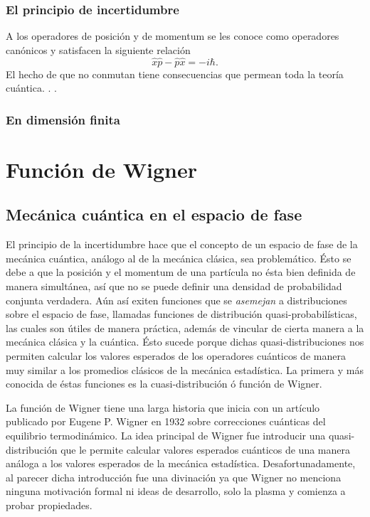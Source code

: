 \documentclass[a4paper]{report}
\begin{document}
  \subsection{El principio de incertidumbre}

  A los operadores de posición y de momentum se les conoce
  como operadores canónicos y satisfacen la siguiente
  relación
  \begin{equation}
    \hat{x} \hat{p} - \hat{p} \hat{x} 
    = -i\hbar.
  \end{equation}
  El hecho de que no conmutan tiene consecuencias que
  permean toda la teoría cuántica. . . 

  \subsection{En dimensión finita}


  \chapter{Función de Wigner}

  \section{Mecánica cuántica en el espacio de fase}

  El principio de la incertidumbre hace que el concepto de
  un espacio de fase de la mecánica cuántica, análogo al de
  la mecánica clásica, sea problemático. Ésto se debe a que
  la posición y el momentum de una partícula no ésta bien
  definida de manera simultánea, así que no se puede definir
  una densidad de probabilidad conjunta verdadera. Aún así
  exiten funciones que se \textit{asemejan} a distribuciones
  sobre el espacio de fase, llamadas funciones de
  distribución quasi-probabilísticas, las cuales son útiles
  de manera práctica, además de vincular de cierta manera a
  la mecánica clásica y la cuántica. Ésto sucede porque
  dichas quasi-distribuciones nos permiten calcular los
  valores esperados de los operadores cuánticos de manera
  muy similar a los promedios clásicos de la mecánica
  estadística. La primera y más conocida de éstas funciones
  es la cuasi-distribución ó función de Wigner.

  La función de Wigner tiene una larga historia que inicia
  con un artículo publicado por Eugene P. Wigner en 1932
  \cite{wignerQuantumCorrectionThermodynamic1932} sobre
  correcciones cuánticas del equilibrio termodinámico. La
  idea principal de Wigner fue introducir una
  quasi-distribución que le permite calcular valores
  esperados cuánticos de una manera análoga a los valores
  esperados de la mecánica estadística. Desafortunadamente,
  al parecer dicha introducción fue una divinación ya que
  Wigner no menciona ninguna motivación formal ni ideas de
  desarrollo, solo la plasma y comienza a probar
  propiedades.
\end{document}
